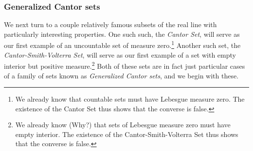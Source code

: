 \subsubsection{Generalized Cantor sets}

We next turn to a couple relatively famous subsets of the real line with particularly interesting properties.  One such such, the \emph{Cantor Set}, will serve as our first example of an uncountable set of measure zero.\footnote{We already know that countable sets must have Lebesgue measure zero.  The existence of the Cantor Set thus shows that the converse is false.}  Another such set, the \emph{Cantor-Smith-Volterra Set}, will serve as our first example of a set with empty interior but positive measure.\footnote{We already know (Why?) that sets of Lebesgue measure zero must have empty interior.  The existence of the Cantor-Smith-Volterra Set thus shows that the converse is false.}  Both of these sets are in fact just particular cases of a family of sets known as \emph{Generalized Cantor sets}, and we begin with these.
